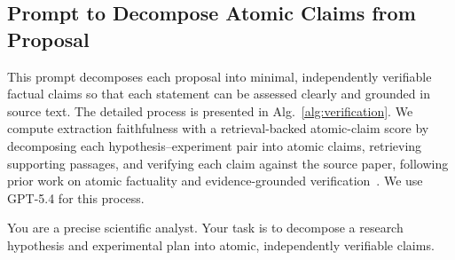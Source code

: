 \subsection{Prompt to Decompose Atomic Claims from Proposal}\label{sec:supp:prompt-decompose}\label{Sec: Prompt to Decompose Atomic Claims from Proposal}

This prompt decomposes each proposal into minimal, independently verifiable factual claims so that each statement can be assessed clearly and grounded in source text. The detailed process is presented in Alg.~\ref{alg:verification}. We compute extraction faithfulness with a retrieval-backed atomic-claim score by decomposing each hypothesis--experiment pair into atomic claims, retrieving supporting passages, and verifying each claim against the source paper, following prior work on atomic factuality and evidence-grounded verification~\citep{min-etal-2023-factscore,thorne2018fever}. We use GPT-5.4 for this process.




\begin{tcolorbox}[title=\textbf{System Prompt to Decompose Atomic Claims from Proposal}]
\small

You are a precise scientific analyst. Your task is to decompose a research hypothesis and experimental plan into atomic, independently verifiable claims.

\end{tcolorbox}

\vspace{1.0cm}

